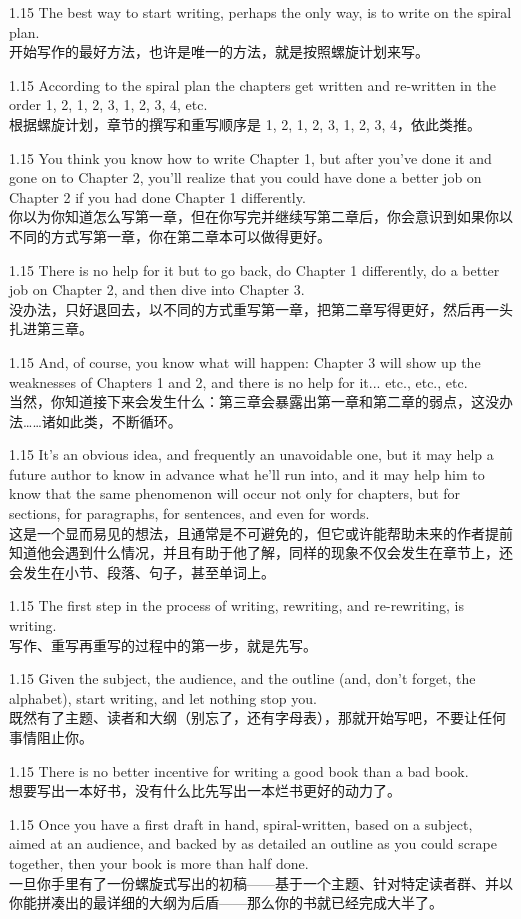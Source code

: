 \documentclass[12pt,a4paper]{article}
\newcommand{\bilingual}[2]{
    \begin{spacing}{1.15} %
        \noindent \normalsize #1 \\[-0.5ex] %
        \small \textcolor{blue!70!black}{#2} %
    \end{spacing}
    \vspace{0.8em} %
}
\begin{document}
\bilingual{The best way to start writing, perhaps the only way, is to write on the spiral plan.}
{开始写作的最好方法，也许是唯一的方法，就是按照螺旋计划来写。} %

\bilingual{According to the spiral plan the chapters get written and re-written in the order 1, 2, 1, 2, 3, 1, 2, 3, 4, etc.}
{根据螺旋计划，章节的撰写和重写顺序是 1, 2, 1, 2, 3, 1, 2, 3, 4，依此类推。} %

\bilingual{You think you know how to write Chapter 1, but after you've done it and gone on to Chapter 2, you'll realize that you could have done a better job on Chapter 2 if you had done Chapter 1 differently.}
{你以为你知道怎么写第一章，但在你写完并继续写第二章后，你会意识到如果你以不同的方式写第一章，你在第二章本可以做得更好。} %

\bilingual{There is no help for it but to go back, do Chapter 1 differently, do a better job on Chapter 2, and then dive into Chapter 3.}
{没办法，只好退回去，以不同的方式重写第一章，把第二章写得更好，然后再一头扎进第三章。} %

\bilingual{And, of course, you know what will happen: Chapter 3 will show up the weaknesses of Chapters 1 and 2, and there is no help for it... etc., etc., etc.}
{当然，你知道接下来会发生什么：第三章会暴露出第一章和第二章的弱点，这没办法……诸如此类，不断循环。} %

\bilingual{It's an obvious idea, and frequently an unavoidable one, but it may help a future author to know in advance what he'll run into, and it may help him to know that the same phenomenon will occur not only for chapters, but for sections, for paragraphs, for sentences, and even for words.}
{这是一个显而易见的想法，且通常是不可避免的，但它或许能帮助未来的作者提前知道他会遇到什么情况，并且有助于他了解，同样的现象不仅会发生在章节上，还会发生在小节、段落、句子，甚至单词上。} %

\bilingual{The first step in the process of writing, rewriting, and re-rewriting, is writing.}
{写作、重写再重写的过程中的第一步，就是先写。} %

\bilingual{Given the subject, the audience, and the outline (and, don't forget, the alphabet), start writing, and let nothing stop you.}
{既然有了主题、读者和大纲（别忘了，还有字母表），那就开始写吧，不要让任何事情阻止你。} %

\bilingual{There is no better incentive for writing a good book than a bad book.}
{想要写出一本好书，没有什么比先写出一本烂书更好的动力了。} %

\bilingual{Once you have a first draft in hand, spiral-written, based on a subject, aimed at an audience, and backed by as detailed an outline as you could scrape together, then your book is more than half done.}
{一旦你手里有了一份螺旋式写出的初稿——基于一个主题、针对特定读者群、并以你能拼凑出的最详细的大纲为后盾——那么你的书就已经完成大半了。} %
\end{document}
